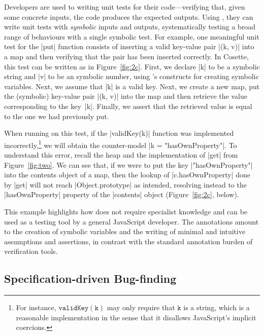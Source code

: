 Developers are used to writing unit tests for their code---verifying that, given some concrete inputs, the code produces the expected outputs. Using \cosette, they can write unit tests with \emph{symbolic} inputs and outputs, systematically testing a broad range of behaviours with a single symbolic test. For example, one meaningful unit test for the \jsinline|put| function consists of inserting a valid key-value pair \jsinline|(k, v)| into a map and then verifying that the pair has been inserted correctly. In Cosette, this test can be written as in Figure~\ref{fig:2c}. First, we declare \jsinline|k| to be a symbolic string and \jsinline|v| to be an symbolic number, using \cosette's constructs for creating symbolic variables. Next, we assume that \jsinline|k| is a valid key. Next, we create a new map, put the (symbolic) key-value pair \jsinline|(k, v)| into the map and then retrieve the value corresponding to the key~\jsinline|k|. Finally, we assert that the retrieved value is equal to the one we had previously put.

% 
When running \cosette on this test, if the \jsinline|validKey(k)| function was implemented incorrectly,\footnote{For instance, $\mathtt{validKey(k)}$ may only require that $\mathtt{k}$ is a string, which is a reasonable implementation in the sense that it disallows JavaScript's implicit coercions.}
we will obtain the counter-model \jsinline|k = "hasOwnProperty"|. To understand this error, recall the heap and the implementation of \jsinline|get| from Figure~\ref{fig:two}. We can see that, if we were to put the key \jsinline|"hasOwnProperty"| into the contents object of a map, then the lookup of \jsinline|c.hasOwnProperty| done by \jsinline|get| will not reach \jsinline|Object.prototype| as intended, resolving instead to the \jsinline|hasOwnProperty| property of the \jsinline|contents| object (Figure~\ref{fig:2c}, below).

This example highlights how \cosette does not require specialist knowledge and can 
be used as a testing tool by a general JavaScript developer. The annotations amount to the creation of 
symbolic variables and the writing of minimal and intuitive 
assumptions and assertions,  in contrast with the standard annotation burden of verification tools.

\vspace*{-0.2cm}
\subsection{Specification-driven Bug-finding}
\label{subsec:sdbf}

